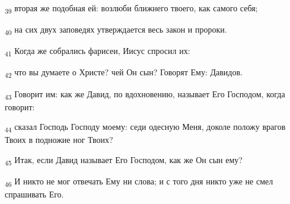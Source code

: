 \begin{tcolorbox}
\textsubscript{39} вторая же подобная ей: возлюби ближнего твоего, как самого себя;
\end{tcolorbox}
\begin{tcolorbox}
\textsubscript{40} на сих двух заповедях утверждается весь закон и пророки.
\end{tcolorbox}
\begin{tcolorbox}
\textsubscript{41} Когда же собрались фарисеи, Иисус спросил их:
\end{tcolorbox}
\begin{tcolorbox}
\textsubscript{42} что вы думаете о Христе? чей Он сын? Говорят Ему: Давидов.
\end{tcolorbox}
\begin{tcolorbox}
\textsubscript{43} Говорит им: как же Давид, по вдохновению, называет Его Господом, когда говорит:
\end{tcolorbox}
\begin{tcolorbox}
\textsubscript{44} сказал Господь Господу моему: седи одесную Меня, доколе положу врагов Твоих в подножие ног Твоих?
\end{tcolorbox}
\begin{tcolorbox}
\textsubscript{45} Итак, если Давид называет Его Господом, как же Он сын ему?
\end{tcolorbox}
\begin{tcolorbox}
\textsubscript{46} И никто не мог отвечать Ему ни слова; и с того дня никто уже не смел спрашивать Его.
\end{tcolorbox}
